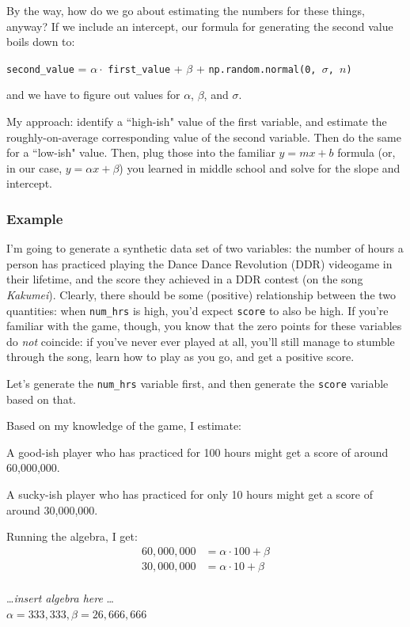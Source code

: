 \documentclass[12pt]{article}
\begin{document}
By the way, how do we go about estimating the numbers for these things,
anyway? If we include an intercept, our formula for generating the second
value boils down to:

\begin{center}
\texttt{second\_value} = $\alpha \cdot$ \texttt{first\_value}
+ $\beta$ + \texttt{np.random.normal(0, $\sigma$, $n$)}
\end{center}

and we have to figure out values for $\alpha$, $\beta$, and $\sigma$.

\vspace{.1in}
My approach: identify a ``high-ish" value of the first variable, and estimate
the roughly-on-average corresponding value of the second variable. Then do the
same for a ``low-ish" value. Then, plug those into the familiar $y=mx+b$
formula (or, in our case, $y=\alpha x + \beta$) you learned in middle school
and solve for the slope and intercept.

\subsubsection{Example}

I'm going to generate a synthetic data set of two variables: the number of
hours a person has practiced playing the Dance Dance Revolution (DDR)
videogame in their lifetime, and the score they achieved in a DDR contest (on
the song \textit{Kakumei}). Clearly, there should be some (positive)
relationship between the two quantities: when \texttt{num\_hrs} is high, you'd
expect \texttt{score} to also be high. If you're familiar with the game,
though, you know that the zero points for these variables do \textit{not}
coincide: if you've never ever played at all, you'll still manage to stumble
through the song, learn how to play as you go, and get a positive score.

Let's generate the \texttt{num\_hrs} variable first, and then generate the
\texttt{score} variable based on that.

Based on my knowledge of the game, I estimate:
\begin{compactitem}
\item A good-ish player who has practiced for 100 hours might get a score of
around 60,000,000.
\item A sucky-ish player who has practiced for only 10 hours might get a score
of around 30,000,000.
\end{compactitem}

Running the algebra, I get:
\begin{align*}
60,000,000 &= \alpha \cdot 100 + \beta\\
30,000,000 &= \alpha \cdot 10 + \beta\\
\end{align*}
\vspace{-.7in}
\begin{center}
\dots \textit{insert algebra here} \dots \\
$\alpha = 333,333, \beta = 26,666,666$
\end{center}
\end{document}
